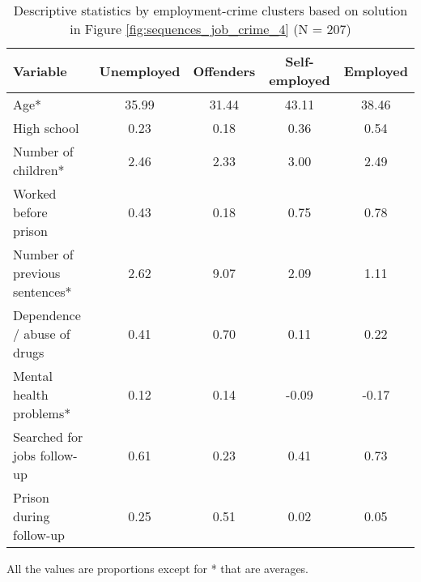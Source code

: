 \begin{table}[htp]
\footnotesize
\setlength{\tabcolsep}{10pt}
\renewcommand{\arraystretch}{1.3}
\begin{threeparttable}
\centering
\caption{Descriptive statistics by employment-crime clusters \newline based on solution in Figure \ref{fig:sequences_job_crime_4} (N = 207)} 
\label{tab:descriptives_job_crime_4}
\begin{tabular}{lcccc}
  \hline
Variable & Unemployed & Offenders & Self-employed & Employed \\ 
  \hline
Age* & 35.99 & 31.44 & 43.11 & 38.46 \\ 
  High school & 0.23 & 0.18 & 0.36 & 0.54 \\ 
  Number of children* & 2.46 & 2.33 & 3.00 & 2.49 \\ 
  Worked before prison & 0.43 & 0.18 & 0.75 & 0.78 \\ 
  Number of previous sentences* & 2.62 & 9.07 & 2.09 & 1.11 \\ 
  Dependence / abuse of drugs & 0.41 & 0.70 & 0.11 & 0.22 \\ 
  Mental health problems* & 0.12 & 0.14 & -0.09 & -0.17 \\ 
  Searched for jobs follow-up & 0.61 & 0.23 & 0.41 & 0.73 \\ 
  Prison during follow-up & 0.25 & 0.51 & 0.02 & 0.05 \\ 
   \hline
\end{tabular}
\begin{tablenotes}
\scriptsize
\item All the values are proportions except for * that are averages.
\end{tablenotes}
\end{threeparttable}
\end{table}
